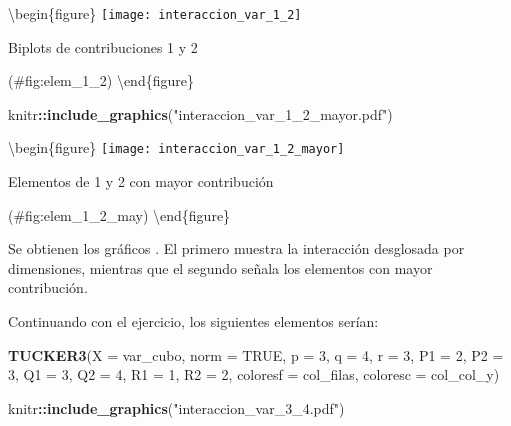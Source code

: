 \documentclass[
  spanish,
]{article}
\newenvironment{Shaded}{\begin{snugshade}}{\end{snugshade}}
\newcommand{\DataTypeTok}[1]{\textcolor[rgb]{0.13,0.29,0.53}{#1}}
\newcommand{\DecValTok}[1]{\textcolor[rgb]{0.00,0.00,0.81}{#1}}
\newcommand{\KeywordTok}[1]{\textcolor[rgb]{0.13,0.29,0.53}{\textbf{#1}}}
\newcommand{\NormalTok}[1]{#1}
\newcommand{\OperatorTok}[1]{\textcolor[rgb]{0.81,0.36,0.00}{\textbf{#1}}}
\newcommand{\OtherTok}[1]{\textcolor[rgb]{0.56,0.35,0.01}{#1}}
\newcommand{\StringTok}[1]{\textcolor[rgb]{0.31,0.60,0.02}{#1}}
\begin{document}
\textbackslash begin\{figure\}
\texttt{[image: interaccion\_var\_1\_2]}

\caption{Biplots de contribuciones 1 y 2}

(\#fig:elem\_1\_2)
\textbackslash end\{figure\}

\begin{Shaded}
\begin{Highlighting}[]
\NormalTok{knitr}\OperatorTok{::}\KeywordTok{include\_graphics}\NormalTok{(}\StringTok{"interaccion\_var\_1\_2\_mayor.pdf"}\NormalTok{)}
\end{Highlighting}
\end{Shaded}

\textbackslash begin\{figure\}
\texttt{[image: interaccion\_var\_1\_2\_mayor]}

\caption{Elementos de 1 y 2 con mayor contribución}

(\#fig:elem\_1\_2\_may)
\textbackslash end\{figure\}

Se obtienen los gráficos . El primero muestra la interacción desglosada por dimensiones, mientras que el segundo señala los elementos con mayor contribución.

Continuando con el ejercicio, los siguientes elementos serían:

\begin{Shaded}
\begin{Highlighting}[]
\KeywordTok{TUCKER3}\NormalTok{(}\DataTypeTok{X =}\NormalTok{ var\_cubo,}
        \DataTypeTok{norm =} \OtherTok{TRUE}\NormalTok{,}
        \DataTypeTok{p =} \DecValTok{3}\NormalTok{,}
        \DataTypeTok{q =} \DecValTok{4}\NormalTok{,}
        \DataTypeTok{r =} \DecValTok{3}\NormalTok{,}
        \DataTypeTok{P1 =} \DecValTok{2}\NormalTok{,}
        \DataTypeTok{P2 =} \DecValTok{3}\NormalTok{,}
        \DataTypeTok{Q1 =} \DecValTok{3}\NormalTok{,}
        \DataTypeTok{Q2 =} \DecValTok{4}\NormalTok{,}
        \DataTypeTok{R1 =} \DecValTok{1}\NormalTok{,}
        \DataTypeTok{R2 =} \DecValTok{2}\NormalTok{,}
        \DataTypeTok{coloresf =}\NormalTok{ col\_filas,}
        \DataTypeTok{coloresc =}\NormalTok{ col\_col\_y)}
\end{Highlighting}
\end{Shaded}

\begin{Shaded}
\begin{Highlighting}[]
\NormalTok{knitr}\OperatorTok{::}\KeywordTok{include\_graphics}\NormalTok{(}\StringTok{"interaccion\_var\_3\_4.pdf"}\NormalTok{)}
\end{Highlighting}
\end{Shaded}
\end{document}
